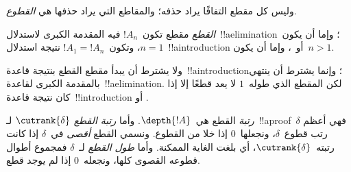 \documentclass[../../../include/open-logic-section]{subfiles}
\begin{document}
وليس كل مقطع التفافًا يراد حذفه؛ والمقاطع التي يراد حذفها هي
\emph{القطوع}.

\begin{defn}
\emph{القطع} مقطع تكون~$!A_n$ فيه المقدمة الكبرى لاستدلال~!!a{elimination}؛
وإما أن يكون~$n=1$، وتكون~$!A_1=!A_n$ نتيجة استدلال~!!a{introduction}
أو~\FalseInt، وإما أن يكون~$n>1$.
\end{defn}

ولا يشترط أن يبدأ مقطع القطع بنتيجة قاعدة~!!a{introduction}؛ وإنما
يشترط أن ينتهي بالمقدمة الكبرى لقاعدة~!!a{elimination}. لكن المقطع الذي
طوله~$1$ لا يعد قطعًا إلا إذا كان نتيجة قاعدة~!!{introduction} أو
\FalseInt.

\begin{defn}
\emph{رتبة} القطع هي~$\depth{!A}$. وأما \emph{رتبة القطع}
$\cutrank{\delta}$ لـ~!!a{proof}~$\delta$ فهي أعظم رتب قطوع~$\delta$،
ونجعلها~$0$ إذا خلا من القطوع. ونسمي القطع \emph{أقصى} في~$\delta$ إذا
كانت رتبته~$\cutrank{\delta}$، أي بلغت الغاية الممكنة. وأما
\emph{طول القطع} لـ~$\delta$ فمجموع أطوال قطوعه القصوى كلها، ونجعله~$0$
إذا لم يوجد قطع.
\end{defn}
\end{document}
